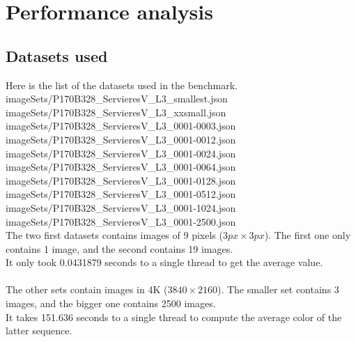 \section{Performance analysis}
\subsection{Datasets used}
Here is the list of the datasets used in the benchmark.
imageSets/P170B328\_ServieresV\_L3\_smallest.json\\
imageSets/P170B328\_ServieresV\_L3\_xxsmall.json\\
imageSets/P170B328\_ServieresV\_L3\_0001-0003.json\\
imageSets/P170B328\_ServieresV\_L3\_0001-0012.json\\
imageSets/P170B328\_ServieresV\_L3\_0001-0024.json\\
imageSets/P170B328\_ServieresV\_L3\_0001-0064.json\\
imageSets/P170B328\_ServieresV\_L3\_0001-0128.json\\
imageSets/P170B328\_ServieresV\_L3\_0001-0512.json\\
imageSets/P170B328\_ServieresV\_L3\_0001-1024.json\\
imageSets/P170B328\_ServieresV\_L3\_0001-2500.json\\

The two first datasets contains images of 9 pixels ($3px \times 3px$). The first one only contains 1 image, and the second contains 19 images.\\
It only took 0.0431879 seconds to a single thread to get the average value.\\
\\
The other sets contain images in 4K ($3840 \times 2160$). The smaller set contains 3 images, and the bigger one contains 2500 images.\\
It takes 151.636 seconds to a single thread to compute the average color of the latter sequence.\\

